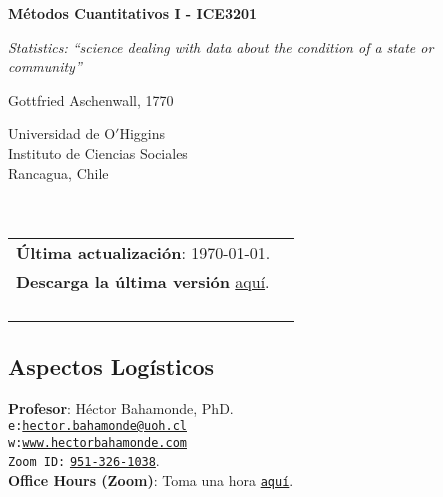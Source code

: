 \documentclass[letterpaper]{article}
\def\name{M\'etodos Cuantitativos I - ICE3201}
\begin{document}

\centerline{\huge \bf \name}

\epigraph{\emph{Statistics: ``science dealing with data about the condition of a state or community''}}{Gottfried Aschenwall, 1770}


\vspace{0.25in}

\begin{minipage}{0.45\linewidth}
 Universidad de O$'$Higgins \\
  Instituto de Ciencias Sociales \\
  Rancagua, Chile\\
  \\
  \\

\end{minipage}
\hspace{4cm}\begin{minipage}{0.45\linewidth}
  \begin{tabular}{ll}
{\bf \'Ultima actualizaci\'on}: \today. \\
 {\bf Descarga la \'ultima versi\'on} \href{https://github.com/hbahamonde/Metodos_Cuanti_I/raw/master/Bahamonde_Metodos_Cuanti_I.pdf}{aqu\'i}.%
    \\
    \\
    \\
    \\
    \\
  \end{tabular}
\end{minipage}



\subsection*{Aspectos Log\'isticos}


\vspace{1mm}
{\bf Profesor}: H\'ector Bahamonde, PhD.\\
\texttt{e:}\href{mailto:hector.bahamonde@uoh.cl}{\texttt{hector.bahamonde@uoh.cl}}\\
\texttt{w:}\href{http://www.hectorbahamonde.com}{\texttt{www.hectorbahamonde.com}}\\
\texttt{Zoom ID:} \href{https://us02web.zoom.us/j/9513261038?pwd=S3BSWXQxZW11NC9CRjRoMmd0TkpEZz09}{\texttt{951-326-1038}}.\\
{\bf Office Hours (Zoom)}: Toma una hora \href{https://calendly.com/bahamonde/officehours}{\texttt{aqu\'i}}.
\end{document}
